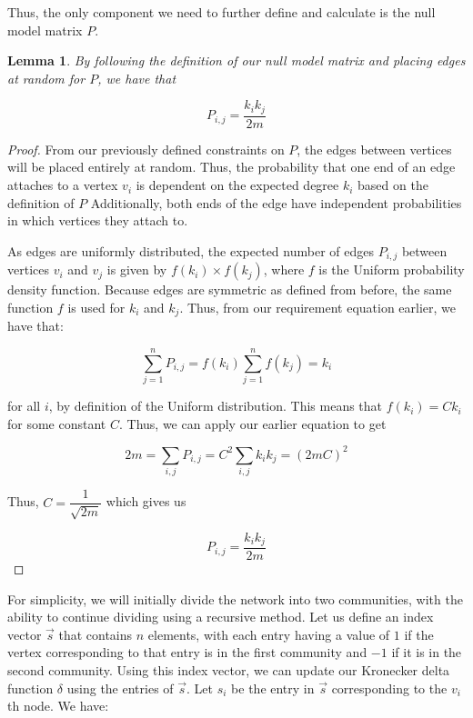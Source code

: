 \documentclass{article}
\newtheorem{lemma}[theorem]{Lemma}
\begin{document}
\bigskip

\noindent Thus, the only component we need to further define and calculate is the null model matrix $P$.


\bigskip

\begin{lemma}
By following the definition of our null model matrix and placing edges at random for $P$, we have that 

$$ P_{i,j} = \dfrac{k_i k_j}{2m} $$

\end{lemma}

\begin{proof}

From our previously defined constraints on $P$, the edges between vertices will be placed entirely at random.
Thus, the probability that one end of an edge attaches to a vertex $v_i$ is dependent on the expected degree $k_i$ based on the definition of $P$
Additionally, both ends of the edge have independent probabilities in which vertices they attach to.

As edges are uniformly distributed, the expected number of edges $P_{i,j}$ between vertices $v_i$ and $v_j$ is given by $f(k_i) \times f(k_j)$, where $f$ is the Uniform probability density function.
Because edges are symmetric as defined from before, the same function $f$ is used for $k_i$ and $k_j$. 
Thus, from our requirement equation earlier, we have that:

$$ \sum_{j = 1}^{n} P_{i,j} = f(k_i) \sum_{j = 1}^{n} f(k_j) = k_i $$

for all $i$, by definition of the Uniform distribution. 
This means that $f(k_i) = C k_i$ for some constant $C$. Thus, we can apply our earlier equation to get

$$ 2m = \sum_{i, j} P_{i,j} = C^2 \sum_{i, j} k_i k_j = (2mC)^2$$

Thus, $C = \dfrac{1}{\sqrt{2m}}$ which gives us 

$$ P_{i,j} = \dfrac{k_i k_j}{2m} $$

\end{proof}

\bigskip

For simplicity, we will initially divide the network into two communities, with the ability to continue dividing using a recursive method.
Let us define an index vector $\vec{s}$ that contains $n$ elements, with each entry having a value of $1$ if the vertex corresponding to that entry is in the first community and $-1$ if it is in the second community.
Using this index vector, we can update our Kronecker delta function $\delta$ using the entries of $\vec{s}$. 
Let $s_i$ be the entry in $\vec{s}$ corresponding to the $v_i$th node. We have:
\end{document}

